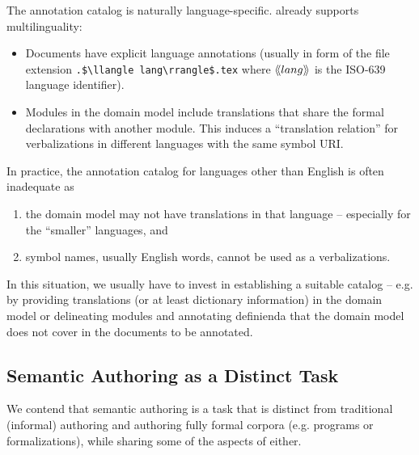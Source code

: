 \documentclass[runningheads]{llncs}
\def\llangle{\langle\kern-.2em\langle}
\def\rrangle{\rangle\kern-.2em\rangle}
\begin{document}
The annotation catalog is naturally language-specific.
\sTeX already supports multilinguality:
\begin{itemize}
\item Documents have explicit language annotations (usually in form of the file extension
  \lstinline[mathescape]|.$\llangle lang\rrangle$.tex| where $\llangle lang\rrangle$ is the
  ISO-639 language identifier).
\item Modules in the domain model include translations that share the formal
    declarations with another module.
        This induces a ``translation relation'' for verbalizations
        in different languages with the same symbol URI.
\end{itemize}
In practice, the annotation catalog for languages other than English is often inadequate as
\begin{enumerate}[\em i\rm)]
    \item the domain model may not have translations in that language -- especially for the ``smaller'' languages, and
    \item symbol names, usually English words, cannot be used as a verbalizations.
\end{enumerate}
In this situation, we usually have to invest in
establishing a suitable catalog -- e.g. by providing translations (or at least dictionary
information) in the domain model or
delineating modules and annotating definienda that the
domain model does not cover in the documents to be annotated.


\subsection{Semantic Authoring as a Distinct Task}
We contend that semantic authoring is a task that is distinct from traditional
(informal) authoring and authoring fully formal corpora (e.g. programs or formalizations),
while sharing some of the aspects of either.
\end{document}
